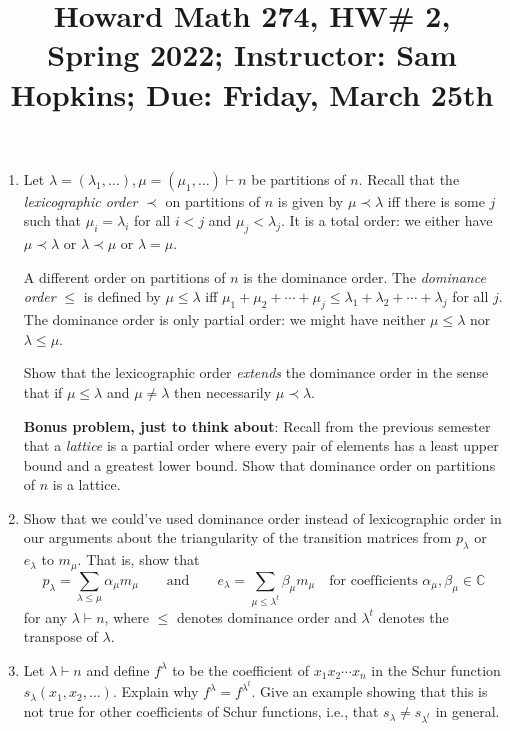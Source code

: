 \documentclass[11pt]{article}
\title{Howard Math 274, HW\# 2, \\ {\normalsize Spring 2022; Instructor: Sam Hopkins; Due: Friday, March 25th}}
\date{}
\begin{document}
\maketitle

\thispagestyle{empty}

\vspace{-1.5cm}

\begin{enumerate}

\item Let $\lambda=(\lambda_1,\ldots), \mu=(\mu_1,\ldots) \vdash n$ be partitions of $n$. Recall that the \emph{lexicographic order} $\prec$ on partitions of $n$ is given by $\mu \prec \lambda$ iff there is some $j$ such that $\mu_i=\lambda_i$ for all $i < j$ and $\mu_j < \lambda_j$. It is a total order: we either have $\mu \prec \lambda$ or $\lambda \prec \mu$ or $\lambda = \mu$.

A different order on partitions of $n$ is the dominance order. The \emph{dominance order} $\leq$ is defined by $\mu \leq \lambda$ iff $\mu_1 + \mu_2 + \cdots + \mu_j \leq \lambda_1 + \lambda_2 + \cdots + \lambda_j$ for all $j$. The dominance order is only partial order: we might have neither $\mu \leq \lambda$ nor $\lambda \leq \mu$.

Show that the lexicographic order \emph{extends} the dominance order in the sense that if $\mu \leq \lambda$ and $\mu \neq \lambda$ then necessarily $\mu \prec \lambda$.

{\bf Bonus problem, just to think about}: Recall from the previous semester that a \emph{lattice} is a partial order where every pair of elements has a least upper bound and a greatest lower bound. Show that dominance order on partitions of $n$ is a lattice.

\item Show that we could've used dominance order instead of lexicographic order in our arguments about the triangularity of the transition matrices from $p_{\lambda}$ or $e_{\lambda}$ to $m_{\mu}$. That is, show that
\[ p_{\lambda} = \sum_{\lambda \leq \mu} \alpha_{\mu} m_{\mu} \qquad \textrm{and} \qquad e_{\lambda} = \sum_{\mu \leq \lambda^t} \beta_{\mu} m_{\mu} \quad \textrm{for coefficients $\alpha_{\mu},\beta_{\mu}\in\mathbb{C}$}\]
for any $\lambda \vdash n$, where $\leq$ denotes dominance order and $\lambda^t$ denotes the transpose of $\lambda$.

\item Let $\lambda \vdash n$ and define $f^{\lambda}$ to be the coefficient of $x_1x_2\cdots x_n$ in the Schur function $s_{\lambda}(x_1,x_2,\ldots)$. Explain why $f^{\lambda} = f^{\lambda^t}$. Give an example showing that this is not true for other coefficients of Schur functions, i.e., that $s_{\lambda} \neq s_{\lambda^t}$ in general.


\end{enumerate}
\end{document}
